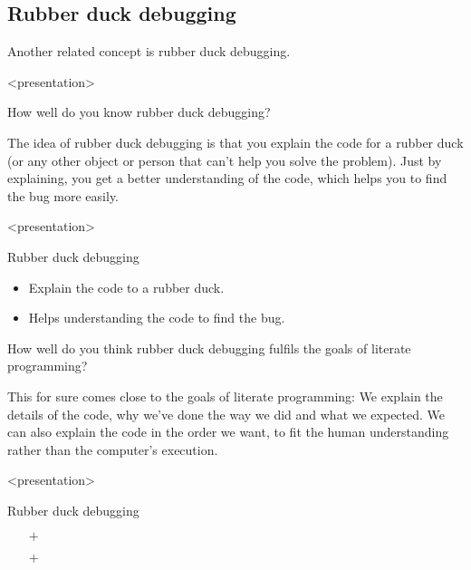 \subsection{Rubber duck debugging}

Another related concept is rubber duck debugging.

\begin{frame}<presentation>
\begin{activity}
How well do you know rubber duck debugging?
\end{activity}
\end{frame}

The idea of rubber duck debugging is that you explain the code for a rubber 
duck (or any other object or person that can't help you solve the problem).
Just by explaining, you get a better understanding of the code, which helps you 
to find the bug more easily.

\begin{frame}<presentation>
\begin{block}{Rubber duck debugging}
  \begin{itemize}
    \item Explain the code to a rubber duck.
    \item Helps understanding the code to find the bug.
  \end{itemize}
\end{block}
\end{frame}

\begin{frame}
\begin{activity}
How well do you think rubber duck debugging fulfils the goals of literate 
programming?
\end{activity}
\end{frame}

This for sure comes close to the goals of literate programming:
We explain the details of the code, why we've done the way we did and what we 
expected.
We can also explain the code in the order we want, to fit the human 
understanding rather than the computer's execution.

\begin{frame}<presentation>
\begin{block}{Rubber duck debugging}
  \begin{itemize}
    \item[\(+\)] {\color{green!75!black}\LPexplain}
    \item[\(+\)] {\color{green!75!black}\LPorder}
  \end{itemize}
\end{block}
\end{frame}

